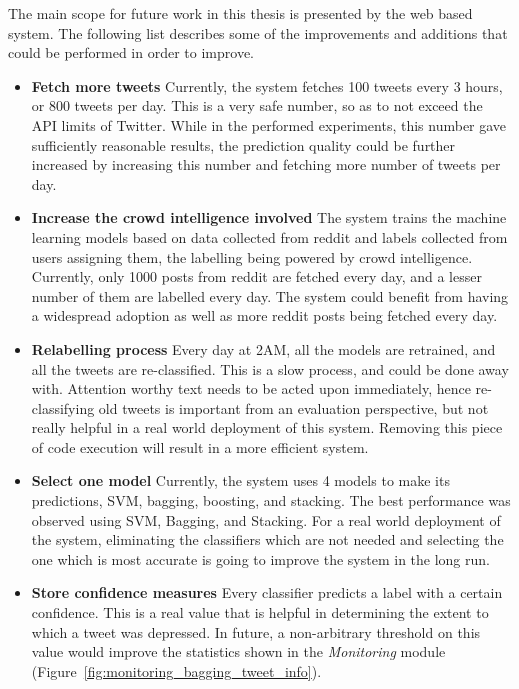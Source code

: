 The main scope for future work in this thesis is presented by the web based system. The following list describes some of the improvements and additions that could be performed in order to improve.\\

\begin{itemize}
    \item{\textbf{Fetch more tweets} Currently, the system fetches 100 tweets every 3 hours, or 800 tweets per day. This is a very safe number, so as to not exceed the API limits of Twitter. While in the performed experiments, this number gave sufficiently reasonable results, the prediction quality could be further increased by increasing this number and fetching more number of tweets per day.}
    \item{\textbf{Increase the crowd intelligence involved} The system trains the machine learning models based on data collected from reddit and labels collected from users assigning them, the labelling being powered by crowd intelligence. Currently, only 1000 posts from reddit are fetched every day, and a lesser number of them are labelled every day. The system could benefit from having a widespread adoption as well as more reddit posts being fetched every day.}
    \item{\textbf{Relabelling process} Every day at 2AM, all the models are retrained, and all the tweets are re-classified. This is a slow process, and could be done away with. Attention worthy text needs to be acted upon immediately, hence re-classifying old tweets is important from an evaluation perspective, but not really helpful in a real world deployment of this system. Removing this piece of code execution will result in a more efficient system.}
    \item{\textbf{Select one model} Currently, the system uses 4 models to make its predictions, SVM, bagging, boosting, and stacking. The best performance was observed using SVM, Bagging, and Stacking. For a real world deployment of the system, eliminating the classifiers which are not needed and selecting the one which is most accurate is going to improve the system in the long run.}
    \item{\textbf{Store confidence measures} Every classifier predicts a label with a certain confidence. This is a real value that is helpful in determining the extent to which a tweet was depressed. In future, a non-arbitrary threshold on this value would improve the statistics shown in the \emph{Monitoring} module (Figure~\ref{fig:monitoring_bagging_tweet_info}).}
\end{itemize}
